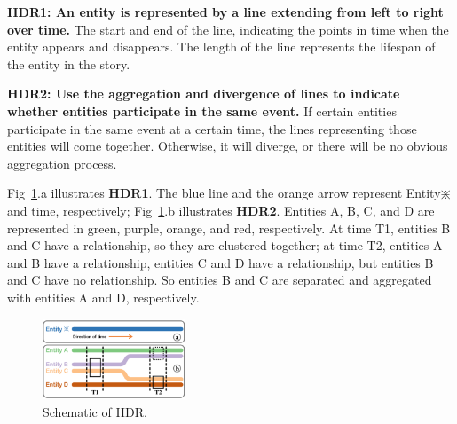   \textbf{HDR1: An entity is represented by a line extending from left to right over time.} The start and end of the line, indicating the points in time when the entity appears and disappears. The length of the line represents the lifespan of the entity in the story.

  \textbf{HDR2: Use the aggregation and divergence of lines to indicate whether entities participate in the same event.} If certain entities participate in the same event at a certain time, the lines representing those entities will come together. Otherwise, it will diverge, or there will be no obvious aggregation process.

Fig~\ref{fig:HDR}.a illustrates \textbf{HDR1}. The blue line and the orange arrow represent Entity$\divideontimes$ and time, respectively; Fig~\ref{fig:HDR}.b illustrates \textbf{HDR2}. Entities A, B, C, and D are represented in green, purple, orange, and red, respectively. At time T1, entities B and C have a relationship, so they are clustered together; at time T2, entities A and B have a relationship, entities C and D have a relationship, but entities B and C have no relationship. So entities B and C are separated and aggregated with entities A and D, respectively.

\begin{figure}[h]
	\centering	
	\includegraphics[width=0.38\textwidth]{Fig/HDR.pdf}
	\vspace{-0.5em}
	\caption{Schematic of HDR.}
	\vspace{-1.5em}
	\label{fig:HDR}
\end{figure}

